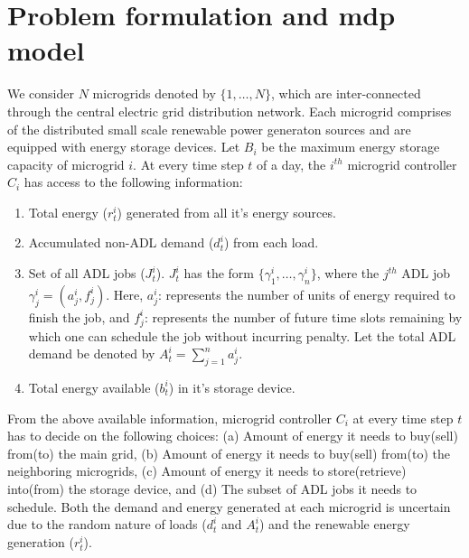 \section{Problem formulation and mdp model} \label{sec:model}
We consider $N$ microgrids denoted by $\{1,\ldots,N\}$, which are inter-connected through the central electric grid distribution network. Each microgrid comprises of the distributed small scale renewable power generaton sources and are equipped with energy storage devices. Let $B_i$ be the maximum energy storage capacity of microgrid $i$. At every time step $t$ of a day, the $i^{th}$ microgrid controller $C_i$ has access to the following information:
\begin{enumerate}[label=(\alph*)]
\item Total energy ($r_t^i$) generated from all it's energy sources.
\item Accumulated non-ADL demand ($d_t^i$) from each load. 
\item Set of all ADL jobs ($J_{t}^{i}$). $J_{t}^{i}$ has the form $\{\gamma_{1}^{i},\ldots,\gamma_{n}^{i}\}$, where the $j^{th}$ ADL job $\gamma_{j}^{i} = (a_{j}^{i}, f_{j}^{i})$. Here, $a_{j}^{i}$: represents the number of units of energy required to finish the job, and  $f_{j}^{i}$: represents the number of future time slots remaining by which one can schedule the job without incurring penalty. Let the total ADL demand be denoted by $A_t^i= \sum_{j=1}^{n} a_j^i$.
\item  Total energy available ($b_{t}^{i}$) in it's storage device.
\end{enumerate} 
From the above available information, microgrid controller  $C_i$ at every time step $t$ has to decide on the following choices: (a)  Amount of energy it needs to buy(sell) from(to) the main grid, (b) Amount of energy it needs to buy(sell) from(to) the neighboring microgrids,
(c) Amount of energy it needs to store(retrieve) into(from) the storage device, and (d) The subset of ADL jobs it needs to schedule. Both the demand and energy generated at each microgrid is uncertain due to the random nature of loads ($d_t^i$ and $A_t^i$) and the renewable energy generation ($r_t^i$). 

